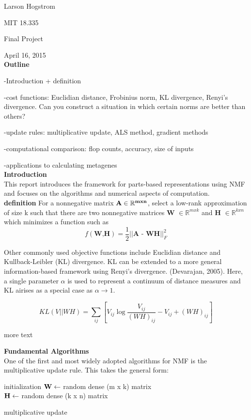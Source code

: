 \documentclass[12pt]{article}
\begin{document}
Larson Hogstrom 

MIT 18.335

Final Project

April 16, 2015 \\

\textbf{Outline}

-Introduction + definition

-cost functions: Euclidian distance, Frobinius norm, KL divergence, Renyi's divergence. Can you construct a situation in which certain norms are better than others?

-update rules: multiplicative update, ALS method, gradient methods

-computational comparison: flop counts, accuracy, size of inputs

-applications to calculating metagenes \\

\textbf{Introduction} \\
This report introduces the framework for parts-based representations using NMF and focuses on the algorithms and numerical aspects of computation. \\

\textbf{definition} For a nonnegative matrix $\bf{A} \in \mathbb{R}^{m x n}$, select a low-rank approximation of size k such that there are two nonnegative matrices \textbf{W} $ \in \mathbb{R}^{m x k}$ and \textbf{H} $ \in \mathbb{R}^{k x n}$ which minimizes a function such as 
$$ f( \textbf{W,H}) = \frac{1}{2} || \textbf{A - WH} || ^{2}_{F}$$


Other commonly used objective functions include Euclidian distance and Kullback-Leibler (KL) divergence. KL can be extended to a more general information-based framework using Renyi's divergence. (Devarajan, 2005). Here, a single parameter $\alpha$ is used to represent a continuum of distance measures and KL airises as a special case as $\alpha \to 1$. 

$$ KL(V || WH) = \sum_{ij}{[V_{ij} \log{ \frac{V_{ij}}{(WH)_{ij}} - V_{ij} + (WH)_{ij}} ]} $$

more text

\pagebreak 

\textbf{Fundamental Algorithms} \\

One of the first and most widely adopted algorithms for NMF is the multiplicative update rule. This takes the general form: \\


\begin{algorithm}[H]

 initialization\;
$\bf{W} \gets $ random dense (m x k) matrix\\
$\bf{H} \gets $ random dense (k x n) matrix\\
 \caption{multiplicative update}
\end{algorithm} 
\end{document}
